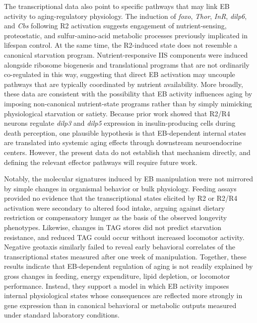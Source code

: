 The transcriptional data also point to specific pathways that may link EB activity to aging-regulatory physiology. The induction of \textit{foxo}, \textit{Thor}, \textit{InR}, \textit{dilp6}, and \textit{Cbs} following R2 activation suggests engagement of nutrient-sensing, proteostatic, and sulfur-amino-acid metabolic processes previously implicated in lifespan control. At the same time, the R2-induced state does not resemble a canonical starvation program. Nutrient-responsive IIS components were induced alongside ribosome biogenesis and translational programs that are not ordinarily co-regulated in this way, suggesting that direct EB activation may uncouple pathways that are typically coordinated by nutrient availability. More broadly, these data are consistent with the possibility that EB activity influences aging by imposing non-canonical nutrient-state programs rather than by simply mimicking physiological starvation or satiety. Because prior work showed that R2/R4 neurons regulate \textit{dilp3} and \textit{dilp5} expression in insulin-producing cells during death perception, one plausible hypothesis is that EB-dependent internal states are translated into systemic aging effects through downstream neuroendocrine centers. However, the present data do not establish that mechanism directly, and defining the relevant effector pathways will require future work.

Notably, the molecular signatures induced by EB manipulation were not mirrored by simple changes in organismal behavior or bulk physiology. Feeding assays provided no evidence that the transcriptional states elicited by R2 or R2/R4 activation were secondary to altered food intake, arguing against dietary restriction or compensatory hunger as the basis of the observed longevity phenotypes. Likewise, changes in TAG stores did not predict starvation resistance, and reduced TAG could occur without increased locomotor activity. Negative geotaxis similarly failed to reveal early behavioral correlates of the transcriptional states measured after one week of manipulation. Together, these results indicate that EB-dependent regulation of aging is not readily explained by gross changes in feeding, energy expenditure, lipid depletion, or locomotor performance. Instead, they support a model in which EB activity imposes internal physiological states whose consequences are reflected more strongly in gene expression than in canonical behavioral or metabolic outputs measured under standard laboratory conditions.

